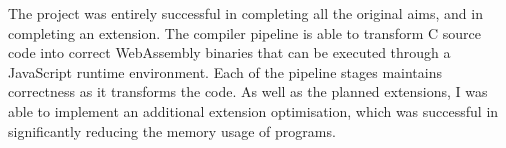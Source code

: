 \documentclass[20-proforma.tex]{subfiles}
\begin{document}
The project was entirely successful in completing all the original aims, and in completing an extension.
The compiler pipeline is able to transform C source code into correct WebAssembly binaries that can be executed through a JavaScript runtime environment.
Each of the pipeline stages maintains correctness as it transforms the code.
As well as the planned extensions, I was able to implement an additional extension optimisation, which was successful in significantly reducing the memory usage of programs.
\end{document}
